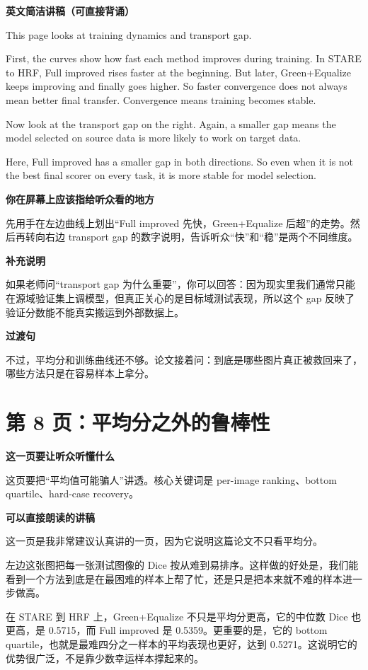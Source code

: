\documentclass[12pt,a4paper]{ctexart}
\newcommand{\EnglishScriptHeading}{\textbf{\color{AccentGreen}英文简洁讲稿（可直接背诵）}}
\begin{document}
\EnglishScriptHeading

This page looks at training dynamics and transport gap.

First, the curves show how fast each method improves during training. In STARE to HRF, Full improved rises faster at the beginning. But later, Green+Equalize keeps improving and finally goes higher. So faster convergence does not always mean better final transfer. Convergence means training becomes stable.

Now look at the transport gap on the right. Again, a smaller gap means the model selected on source data is more likely to work on target data.

Here, Full improved has a smaller gap in both directions. So even when it is not the best final scorer on every task, it is more stable for model selection.

\textbf{你在屏幕上应该指给听众看的地方}

先用手在左边曲线上划出“Full improved 先快，Green+Equalize 后超”的走势。然后再转向右边 transport gap 的数字说明，告诉听众“快”和“稳”是两个不同维度。

\textbf{补充说明}

如果老师问“transport gap 为什么重要”，你可以回答：因为现实里我们通常只能在源域验证集上调模型，但真正关心的是目标域测试表现，所以这个 gap 反映了验证分数能不能真实搬运到外部数据上。

\textbf{过渡句}

不过，平均分和训练曲线还不够。论文接着问：到底是哪些图片真正被救回来了，哪些方法只是在容易样本上拿分。

\section*{第 8 页：平均分之外的鲁棒性}

\textbf{这一页要让听众听懂什么}

这页要把“平均值可能骗人”讲透。核心关键词是 per-image ranking、bottom quartile、hard-case recovery。

\textbf{可以直接朗读的讲稿}

这一页是我非常建议认真讲的一页，因为它说明这篇论文不只看平均分。

左边这张图把每一张测试图像的 Dice 按从难到易排序。这样做的好处是，我们能看到一个方法到底是在最困难的样本上帮了忙，还是只是把本来就不难的样本进一步做高。

在 STARE 到 HRF 上，Green+Equalize 不只是平均分更高，它的中位数 Dice 也更高，是 0.5715，而 Full improved 是 0.5359。更重要的是，它的 bottom quartile，也就是最难四分之一样本的平均表现也更好，达到 0.5271。这说明它的优势很广泛，不是靠少数幸运样本撑起来的。
\end{document}
